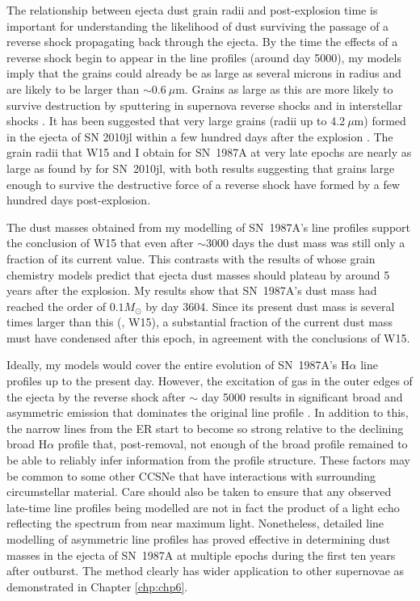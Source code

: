 The relationship between ejecta dust grain radii and post-explosion 
time is important for understanding the likelihood of dust surviving the 
passage of a reverse shock propagating back through the ejecta. By the 
time the effects of a reverse shock begin to appear in the line profiles 
(around day 5000), my models imply that the grains could already be as 
large as several microns in radius and are likely to be larger than $\sim 
0.6~\mu$m. Grains as large as this are more likely to survive destruction 
by sputtering in supernova reverse shocks and in interstellar shocks 
\citep{Silvia2010, Silvia2012, Slavin2015}.
It has been suggested that very large grains (radii up to 4.2$~\mu$m) 
formed in the ejecta of SN 2010jl within a few hundred days after the 
explosion \cite{Gall2014}. The grain radii that W15 and I obtain 
for SN~1987A at very late epochs are nearly as large as found by 
\citet{Gall2014} for SN~2010jl, with both results suggesting that grains 
large enough to survive the destructive force of a reverse shock have 
formed by a few hundred days post-explosion. 

The dust masses obtained from my modelling of SN~1987A's line profiles 
support the conclusion of W15 that even after $\sim$3000 days the dust 
mass was still only a fraction of its current value. This contrasts with 
the results of \citet{Sarangi2015} whose grain chemistry models predict 
that ejecta dust masses should plateau by around 5 years after the 
explosion. My results show that SN~1987A's dust mass had reached 
the order of $0.1M_{\odot}$ by day 3604.  Since its present dust mass is 
several times larger than this (\citet{Matsuura2015}, W15), a 
substantial fraction of the current dust mass must have condensed after 
this epoch, in agreement with the conclusions of W15.

Ideally, my models would cover the entire evolution of SN~1987A's 
H$\alpha$ line profiles up to the present day.  However, the excitation of 
gas in the outer edges of the ejecta by the reverse shock after $\sim$ day 
5000 results in significant broad and asymmetric emission that 
dominates the original line profile \citep{Fransson2013}.  In addition to 
this, the narrow lines from the ER start to become so 
strong relative to the declining broad H$\alpha$ profile that, 
post-removal, not enough of the broad profile remained to be 
able to reliably infer information from the profile structure. These 
factors may be 
common to some other CCSNe that have interactions with surrounding 
circumstellar material. Care should also be taken to ensure that any 
observed late-time line profiles being modelled are not in fact the 
product of a light echo reflecting the spectrum from near maximum light. 
Nonetheless, detailed line modelling of asymmetric line profiles has 
proved effective in determining dust masses in the ejecta of SN~1987A at 
multiple epochs during the first ten years after outburst. The method 
clearly has wider application to other supernovae as demonstrated in Chapter \ref{chp:chp6}.


